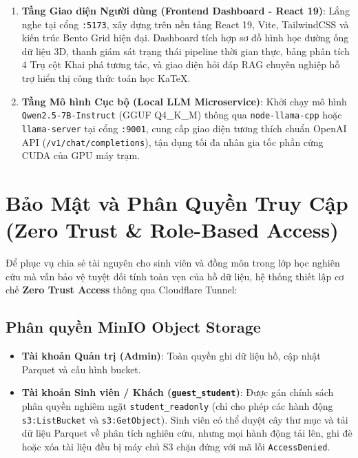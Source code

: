 \begin{enumerate}[label=\textbf{\arabic*.}]
  \item \textbf{Tầng Giao diện Người dùng (Frontend Dashboard - React 19)}:
    Lắng nghe tại cổng \texttt{:5173}, xây dựng trên nền tảng React 19, Vite, TailwindCSS và kiến trúc Bento Grid hiện đại. Dashboard tích hợp sơ đồ hình học đường ống dữ liệu 3D, thanh giám sát trạng thái pipeline thời gian thực, bảng phân tích 4 Trụ cột Khai phá tương tác, và giao diện hỏi đáp RAG chuyên nghiệp hỗ trợ hiển thị công thức toán học KaTeX.
  \item \textbf{Tầng Mô hình Cục bộ (Local LLM Microservice)}:
    Khởi chạy mô hình \texttt{Qwen2.5-7B-Instruct} (GGUF Q4\_K\_M) thông qua \texttt{node-llama-cpp} hoặc \texttt{llama-server} tại cổng \texttt{:9001}, cung cấp giao diện tương thích chuẩn OpenAI API (\texttt{/v1/chat/completions}), tận dụng tối đa nhân gia tốc phần cứng CUDA của GPU máy trạm.
\end{enumerate}

\section{Bảo Mật và Phân Quyền Truy Cập (Zero Trust \& Role-Based Access)}

Để phục vụ chia sẻ tài nguyên cho sinh viên và đồng môn trong lớp học nghiên cứu mà vẫn bảo vệ tuyệt đối tính toàn vẹn của hồ dữ liệu, hệ thống thiết lập cơ chế \textbf{Zero Trust Access} thông qua Cloudflare Tunnel:

\subsection{Phân quyền MinIO Object Storage}
\begin{itemize}
  \item \textbf{Tài khoản Quản trị (Admin)}: Toàn quyền ghi dữ liệu hồ, cập nhật Parquet và cấu hình bucket.
  \item \textbf{Tài khoản Sinh viên / Khách (\texttt{guest\_student})}: Được gán chính sách phân quyền nghiêm ngặt \lstinline{student_readonly} (chỉ cho phép các hành động \texttt{s3:ListBucket} và \texttt{s3:GetObject}). Sinh viên có thể duyệt cây thư mục và tải dữ liệu Parquet về phân tích nghiên cứu, nhưng mọi hành động tải lên, ghi đè hoặc xóa tài liệu đều bị máy chủ S3 chặn đứng với mã lỗi \texttt{AccessDenied}.
\end{itemize}


